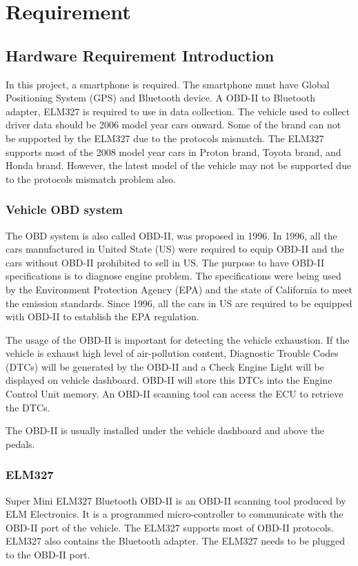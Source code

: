 \chapter{Requirement}
\section{Hardware Requirement Introduction}
In this project, a smartphone is required. The smartphone must have Global Positioning System (GPS) and Bluetooth device. A OBD-II to Bluetooth adapter, ELM327 is required to use in data collection. The vehicle used to collect driver data should be 2006 model year cars onward. Some of the brand can not be supported by the ELM327 due to the protocols mismatch. The ELM327 supports most of the 2008 model year cars in Proton brand, Toyota brand, and Honda brand. However, the latest model of the vehicle may not be supported due to the protocols mismatch problem also.

\subsection{Vehicle OBD system}
The OBD system is also called OBD-II, was proposed in 1996. In 1996, all the cars manufactured in United State (US) were required to equip OBD-II and the cars without OBD-II prohibited to sell in US. The purpose to have OBD-II specifications is to diagnose engine problem. The specifications were being used by the Environment Protection Agency (EPA) and the state of California to meet the emission standards. Since 1996, all the cars in US are required to be equipped with OBD-II to establish the EPA regulation. 

The usage of the OBD-II is important for detecting the vehicle exhaustion. If the vehicle is exhaust high level of air-pollution content, Diagnostic Trouble Codes (DTCs) will be generated by the OBD-II and a Check Engine Light will be displayed on vehicle dashboard. OBD-II will store this DTCs into the  Engine Control Unit memory. An OBD-II scanning tool can access the ECU to retrieve the DTCs.

The OBD-II is usually installed under the vehicle dashboard and above the pedals.

\subsection{ELM327}
Super Mini ELM327 Bluetooth OBD-II is an OBD-II scanning tool produced by ELM Electronics. It is a programmed micro-controller to communicate with the OBD-II port of the vehicle. The ELM327 supports most of OBD-II protocols. ELM327 also contains the Bluetooth adapter. The ELM327 needs to be plugged to the OBD-II port.

